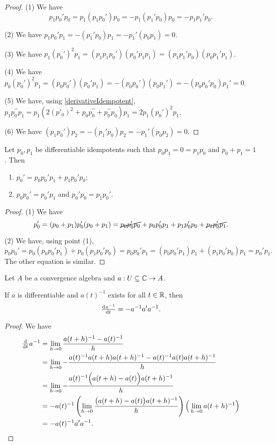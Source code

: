 \begin{proof}
(1) We have
\[ p_1p_0'p_0 = p_1(p_1p_0')p_0 = -p_1(p_1'p_0)p_0 = -p_1p_1'p_0. \]

(2) We have $p_1p_0'p_1 = -(p_1'p_0)p_1 = -p_1'(p_0p_1) = 0$.

(3) We have $p_1(p_0')^2p_1 = (p_1p_1p_0')(p_0'p_1p_1) = (p_1p_1'p_0)(p_0p_1'p_1)$.

(4) We have $p_0(p_0')^2p_1 = (p_0p_0')(p_0'p_1) = -(p_0p_0')(p_0p_1') = -(p_0p_0'p_0)p_1' = 0$.

(5) We have, using \ref{derivativeIdempotent}, $p_1p^{\prime\prime}_0p_1 = p_1(2(p'_0)^2 + p_0p_0^{\prime\prime} + p_0^{\prime\prime}p_0)p_1 = 2p_1(p_0')^2p_1$.

(6) We have $(p_1p_0')p_2 = - (p_1'p_0)p_2 = - p_1'(p_0p_2) = 0$.
\end{proof}
\begin{corollary} \label{derivativeIdempotentOffDiagonal}
Let $p_0,p_1$ be differentiable idempotents such that $p_0p_1 = 0 = p_1p_0$ and $p_0 + p_1 = 1$. Then
\begin{enumerate}
\item $p_0' = p_0p_0'p_1 + p_1p_0'p_0$;
\item $p_0p_0' = p_0'p_1$ and $p_0'p_0 = p_1p_0'$.
\end{enumerate}
\end{corollary}
\begin{proof}
(1) We have
\[ p_0' = (p_0 + p_1)p_0'(p_0 + p_1) = \cancel{p_0p_0'p_0} + p_0p_0'p_1 + p_1p_0'p_0 + \cancel{p_1p_0'p_1}. \]

(2) We have, using point (1),
\[ p_0p_0' = p_0(p_0p_0'p_1) + p_0(p_1p_0'p_0) = p_0p_0'p_1 = (p_0p_0'p_1)p_1 + (p_1p_0'p_0)p_1 = p_0'p_1. \]
The other equation is similar.
\end{proof}


\begin{proposition}
Let $A$ be a convergence algebra and $a: U\subseteq\mathbb{C} \to A$.

If $a$ is differentiable and $a(t)^{-1}$ exists for all $t\in \mathbb{R}$, then
\[ \od{a^{-1}}{t} = -a^{-1}a'a^{-1}. \]
\end{proposition}
\begin{proof}
We have
\begin{align*}
\od{}{t}a^{-1} &= \lim_{h\to 0}\frac{a(t+h)^{-1} - a(t)^{-1}}{h} \\
&= \lim_{h\to 0} -\frac{a(t)^{-1}a(t+h)a(t+h)^{-1} - a(t)^{-1}a(t)a(t+h)^{-1}}{h} \\
&= \lim_{h\to 0} -\frac{a(t)^{-1}\Big(a(t+h) - a(t)\Big)a(t+h)^{-1}}{h} \\
&= -a(t)^{-1}\left(\lim_{h\to 0}\frac{\big(a(t+h) - a(t)\big)a(t+h)^{-1}}{h}\right)\Big(\lim_{h\to 0}a(t+h)^{-1}\Big) \\
&= -a(t)^{-1}a'a^{-1}.
\end{align*}
\end{proof}


